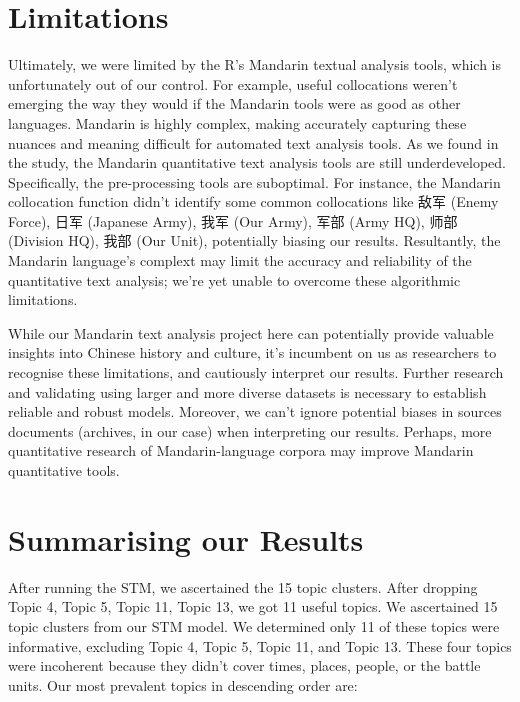 \documentclass[12pt,letterpaper]{article}
\begin{document}
\begin{CJK*}{UTF8}{gbsn}
		\section*{Limitations}
		\vspace{.1cm}
		Ultimately, we were limited by the R’s Mandarin textual analysis tools, which is unfortunately out of our control. For example, useful collocations weren’t emerging the way they would if the Mandarin tools were as good as other languages. Mandarin is highly complex, making accurately capturing these nuances and meaning difficult for automated text analysis tools. As we found in the study, the Mandarin quantitative text analysis tools are still underdeveloped. Specifically, the pre-processing tools are suboptimal. For instance, the Mandarin collocation function didn’t identify some common collocations like 敌军 (Enemy Force), 日军 (Japanese Army), 我军 (Our Army), 军部 (Army HQ), 师部 (Division HQ), 我部 (Our Unit), potentially biasing our results. Resultantly, the Mandarin language’s complext may limit the accuracy and reliability of the quantitative text analysis; we’re yet unable to overcome these algorithmic limitations. 
		
		\vspace{.35cm}
		
		\noindent While our Mandarin text analysis project here can potentially provide valuable insights into Chinese history and culture, it’s incumbent on us as researchers to recognise these limitations, and cautiously interpret our results. Further research and validating using larger and more diverse datasets is necessary to establish reliable and robust models. Moreover, we can’t ignore potential biases in sources documents (archives, in our case) when interpreting our results. Perhaps, more quantitative research of Mandarin-language corpora may improve Mandarin quantitative tools.
		\vspace{.5cm}
		\maketitle
		\section*{Summarising our Results}
		\vspace{.1cm}
		After running the STM, we ascertained the 15 topic clusters. After dropping Topic 4, Topic 5, Topic 11, Topic 13, we got 11 useful topics.  
		We ascertained 15 topic clusters from our STM model. We determined only 11 of these topics were informative, excluding Topic 4, Topic 5, Topic 11, and Topic 13. These four topics were incoherent because they didn’t cover times, places, people, or the battle units. Our most prevalent topics in descending order are:
		

\end{CJK*}
\end{document}
